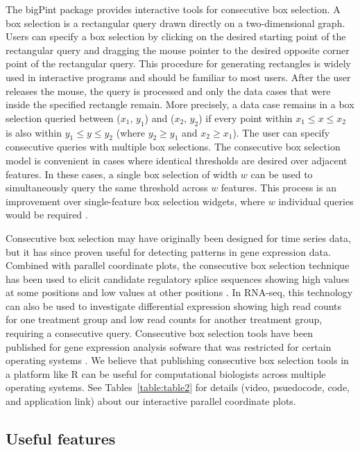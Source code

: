 \documentclass[parskip=full]{bmcart}
\begin{document}
The bigPint package provides interactive tools for consecutive box selection. A box selection is a rectangular query drawn directly on a two-dimensional graph. Users can specify a box selection by clicking on the desired starting point of the rectangular query and dragging the mouse pointer to the desired opposite corner point of the rectangular query. This procedure for generating rectangles is widely used in interactive programs and should be familiar to most users. After the user releases the mouse, the query is processed and only the data cases that were inside the specified rectangle remain. More precisely, a data case remains in a box selection queried between ($x_1$, $y_1$) and ($x_2$, $y_2$) if every point within $x_1 \leq x \leq x_2$ is also within $y_1 \leq y \leq y_2$ (where $y_2 \geq y_1$ and $x_2 \geq x_1$). The user can specify consecutive queries with multiple box selections. The consecutive box selection model is convenient in cases where identical thresholds are desired over adjacent features. In these cases, a single box selection of width $w$ can be used to simultaneously query the same threshold across $w$ features. This process is an improvement over single-feature box selection widgets, where $w$ individual queries would be required \cite{hochheiser2003dynamic}. 

Consecutive box selection may have originally been designed for time series data, but it has since proven useful for detecting patterns in gene expression data. Combined with parallel coordinate plots, the consecutive box selection technique has been used to elicit candidate regulatory splice sequences showing high values at some positions and low values at other positions \cite{hochheiser2003dynamic}. In RNA-seq, this technology can also be used to investigate differential expression showing high read counts for one treatment group and low read counts for another treatment group, requiring a consecutive query. Consecutive box selection tools have been published for gene expression analysis sofware that was restricted for certain operating systems \cite{hochheiser2003dynamic}. We believe that publishing consecutive box selection tools in a platform like R can be useful for computational biologists across multiple operating systems. See Tables~\ref{table:table2} for details (video, psuedocode, code, and application link) about our interactive parallel coordinate plots.

\subsection*{Useful features}
\end{document}
